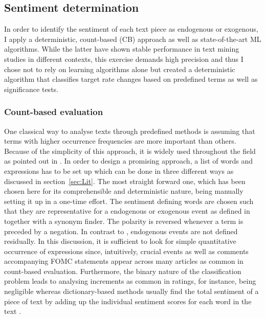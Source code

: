 %
\subsection{Sentiment determination}

In order to identify the sentiment of each text piece as endogenous or exogenous, I apply a deterministic, count-based (CB) approach as well as state-of-the-art ML algorithms. While the latter have shown stable performance in text mining studies in different contexts, this exercise demands high precision and thus I chose not to rely on learning algorithms alone but created a deterministic algorithm that classifies target rate changes based on predefined terms as well as significance tests. 

%
\subsubsection{Count-based evaluation}

One classical way to analyse texts through predefined methods is assuming that terms with higher occurrence frequencies are more important than others. Because of the simplicity of this approach, it is widely used throughout the field as pointed out in \textcite{Meyer.2008}. In order to design a promising approach, a list of words and expressions has to be set up which can be done in three different ways as discussed in section~\ref{sec:Lit}. The most straight forward one, which has been chosen here for its comprehensible and deterministic nature, being manually setting it up in a one-time effort. The sentiment defining words are chosen such that they are representative for a endogenous or exogenous event as defined in \textcite{Ellingsen.2003} together with a synonym finder. The polarity is reversed whenever a term is preceded by a negation. In contrast to \textcite{Ellingsen.2003}, endogenous events are not defined residually.
In this discussion, it is sufficient to look for simple quantitative occurrence of expressions since, intuitively, crucial events as well as comments accompanying FOMC statements appear across many articles as common in count-based evaluation. Furthermore, the binary nature of the classification problem leads to analysing increments as common in ratings, for instance, being negligible whereas dictionary-based methods usually find the total sentiment of a piece of text by adding up the individual sentiment scores for each word in the text \parencite{Silge.2017}. 

